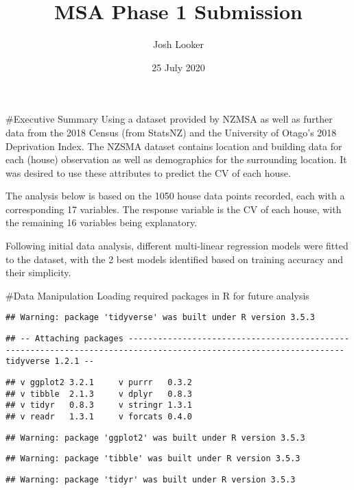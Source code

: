 \documentclass[
]{article}
\title{MSA Phase 1 Submission}
\author{Josh Looker}
\date{25 July 2020}
\begin{document}
\maketitle

\#Executive Summary Using a dataset provided by NZMSA as well as further
data from the 2018 Census (from StatsNZ) and the University of Otago's
2018 Deprivation Index. The NZSMA dataset contains location and building
data for each (house) observation as well as demographics for the
surrounding location. It was desired to use these attributes to predict
the CV of each house.

The analysis below is based on the 1050 house data points recorded, each
with a corresponding 17 variables. The response variable is the CV of
each house, with the remaining 16 variables being explanatory.

Following initial data analysis, different multi-linear regression
models were fitted to the dataset, with the 2 best models identified
based on training accuracy and their simplicity.

\#Data Manipulation Loading required packages in R for future analysis

\begin{verbatim}
## Warning: package 'tidyverse' was built under R version 3.5.3
\end{verbatim}

\begin{verbatim}
## -- Attaching packages ------------------------------------------------------------------------------------------------------------------ tidyverse 1.2.1 --
\end{verbatim}

\begin{verbatim}
## v ggplot2 3.2.1     v purrr   0.3.2
## v tibble  2.1.3     v dplyr   0.8.3
## v tidyr   0.8.3     v stringr 1.3.1
## v readr   1.3.1     v forcats 0.4.0
\end{verbatim}

\begin{verbatim}
## Warning: package 'ggplot2' was built under R version 3.5.3
\end{verbatim}

\begin{verbatim}
## Warning: package 'tibble' was built under R version 3.5.3
\end{verbatim}

\begin{verbatim}
## Warning: package 'tidyr' was built under R version 3.5.3
\end{verbatim}
\end{document}
